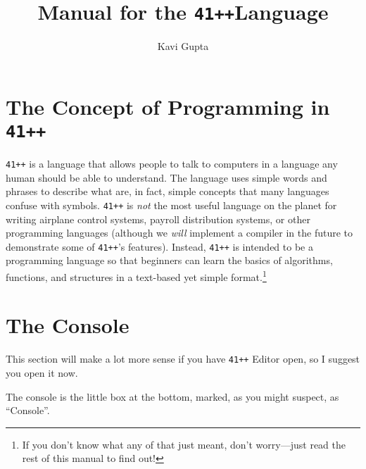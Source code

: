 \documentclass{article}
\newcommand{\code}[1]{\texttt{#1}}
\newcommand{\name}{\code{41++}}
\newcommand{\ide}{\name{} Editor}
\begin{document}
\title{Manual for the \name Language}
\author{Kavi Gupta}
\maketitle

\section{The Concept of Programming in \name}
\name{} is a language that allows people to talk to computers in a language any human should be able to understand. The language uses simple words and phrases to describe what are, in fact, simple concepts that many languages confuse with symbols. \name{} is \emph{not} the most useful language on the planet for writing airplane control systems, payroll distribution systems, or other programming languages (although we \emph{will} implement a compiler in the future to demonstrate some of \name{}'s features). Instead, \name{} is intended to be a programming language so that beginners can learn the basics of algorithms, functions, and structures in a text-based yet simple format.\footnote{If you don't know what any of that just meant, don't worry---just read the rest of this manual to find out!}

\section{The Console}
This section will make a lot more sense if you have \ide{} open, so I suggest you open it now.

The console is the little box at the bottom, marked, as you might suspect, as ``Console''.
\end{document}
